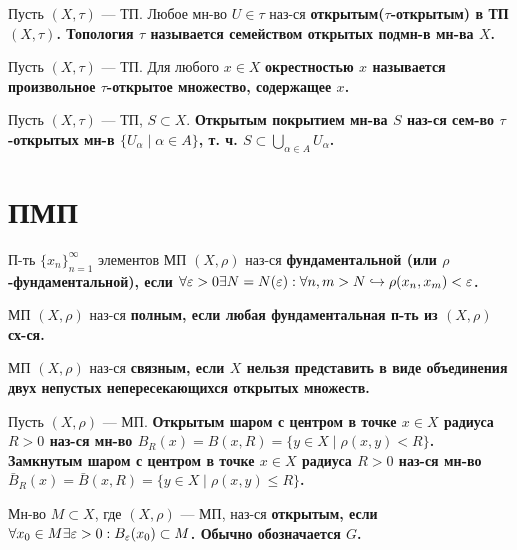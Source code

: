 \begin{defn}
Пусть $(X, \tau)$ --- ТП. Любое мн-во $U \in \tau$ наз-ся \bf{открытым}($\tau$-открытым) в ТП $(X, \tau)$. Топология $\tau$ называется \bf{семейством открытых подмн-в} мн-ва $X$.
\end{defn}

\begin{defn}
Пусть $(X, \tau)$ --- ТП. Для любого $x \in X$ \bf{окрестностью} $x$ называется произвольное $\tau$-открытое множество, содержащее $x$.
\end{defn}

\begin{defn}
Пусть $(X, \tau)$ --- ТП, $S \subset X$. \bf{Открытым покрытием} мн-ва $S$ наз-ся сем-во $\tau$-открытых мн-в $\{U_\alpha \mid \alpha \in A\}$, т. ч. $S \subset \bigcup\limits_{\alpha \in A} U_\alpha$.
\end{defn}

\section{ПМП}

\begin{defn}
П-ть $\{x_n\}_{n=1}^{\infty}$ элементов МП $(X, \rho)$ наз-ся \bf{фундаментальной} (или $\rho$-фундаментальной), если $\forall \varepsilon > 0 \exists N = N(\varepsilon):\forall n, m > N \hookrightarrow \rho(x_n, x_m) < \varepsilon$.
\end{defn}

\begin{defn}
МП $(X, \rho)$ наз-ся \bf{полным}, если любая фундаментальная п-ть из $(X, \rho)$ сх-ся.
\end{defn}

\begin{defn}
МП $(X, \rho)$ наз-ся \bf{связным}, если $X$ нельзя представить в виде объединения двух непустых непересекающихся открытых множеств.
\end{defn}

\begin{defn}
Пусть $(X, \rho)$ --- МП. \bf{Открытым шаром} с центром в точке $x \in X$ радиуса $R>0$ наз-ся мн-во $B_R(x) = B(x, R) = \{y \in X \mid \rho(x, y) < R\}$.
\bf{Замкнутым шаром} с центром в точке $x \in X$ радиуса $R>0$ наз-ся мн-во $\bar{B}_R(x) = \bar{B}(x, R) = \{y \in X \mid \rho(x, y) \le R\}$.
\end{defn}

\begin{defn}
Мн-во $M \subset X$, где $(X, \rho)$ --- МП, наз-ся \bf{открытым}, если $\forall x_0 \in M \exists \varepsilon > 0: B_\varepsilon(x_0) \subset M$. Обычно обозначается $G$.
\end{defn}

